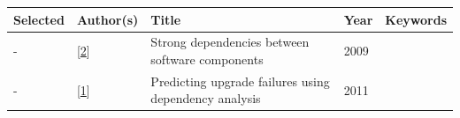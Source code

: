 \documentclass[]{book}
\begin{document}
\begin{longtable}[]{@{}lllll@{}}
\toprule
\begin{minipage}[b]{0.01\columnwidth}\raggedright\strut
Selected\strut
\end{minipage} & \begin{minipage}[b]{0.09\columnwidth}\raggedright\strut
Author(s)\strut
\end{minipage} & \begin{minipage}[b]{0.34\columnwidth}\raggedright\strut
Title\strut
\end{minipage} & \begin{minipage}[b]{0.02\columnwidth}\raggedright\strut
Year\strut
\end{minipage} & \begin{minipage}[b]{0.39\columnwidth}\raggedright\strut
Keywords\strut
\end{minipage}\tabularnewline
\midrule
\endhead
\begin{minipage}[t]{0.01\columnwidth}\raggedright\strut
-\strut
\end{minipage} & \begin{minipage}[t]{0.09\columnwidth}\raggedright\strut
{[}\protect\hyperlink{ref-Abate2009}{2}{]}\strut
\end{minipage} & \begin{minipage}[t]{0.34\columnwidth}\raggedright\strut
Strong dependencies between software components\strut
\end{minipage} & \begin{minipage}[t]{0.02\columnwidth}\raggedright\strut
2009\strut
\end{minipage} & \begin{minipage}[t]{0.39\columnwidth}\raggedright\strut
\strut
\end{minipage}\tabularnewline
\begin{minipage}[t]{0.01\columnwidth}\raggedright\strut
-\strut
\end{minipage} & \begin{minipage}[t]{0.09\columnwidth}\raggedright\strut
{[}\protect\hyperlink{ref-Abate2011}{1}{]}\strut
\end{minipage} & \begin{minipage}[t]{0.34\columnwidth}\raggedright\strut
Predicting upgrade failures using dependency analysis\strut
\end{minipage} & \begin{minipage}[t]{0.02\columnwidth}\raggedright\strut
2011\strut
\end{minipage} & \begin{minipage}[t]{0.39\columnwidth}\raggedright\strut

\end{minipage}
\end{longtable}
\end{document}
